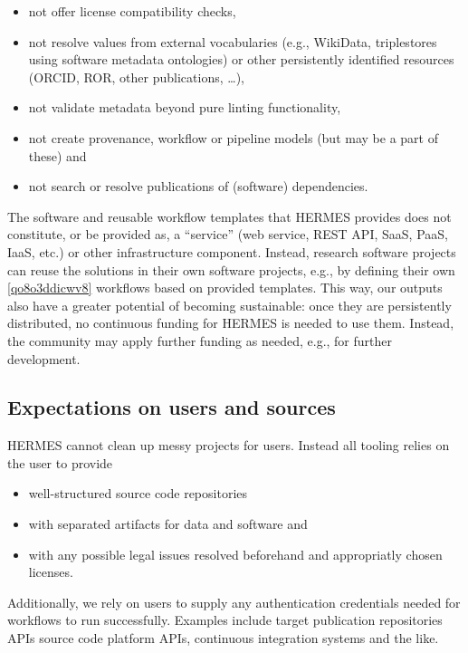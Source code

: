 \documentclass{article}
\begin{document}
\begin{itemize}  
\item not offer license compatibility checks,


\item not resolve values from external vocabularies (e.g., WikiData, triplestores using software metadata ontologies) or other persistently identified resources (ORCID, ROR, other publications, …),


\item not validate metadata beyond pure linting functionality,


\item not create provenance, workflow or pipeline models (but may be a part of these) and


\item not search or resolve publications of (software) dependencies.


\end{itemize}The software and reusable workflow templates that HERMES provides does not constitute, or be provided as, a “service” (web service, REST API, SaaS, PaaS, IaaS, etc.) or other infrastructure component. Instead, research software projects can reuse the solutions in their own software projects, e.g., by defining their own \ref{qo8o3ddicwv8} workflows based on provided templates. This way, our outputs also have a greater potential of becoming sustainable: once they are persistently distributed, no continuous funding for HERMES is needed to use them. Instead, the community may apply further funding as needed, e.g., for further development.



\subsection{Expectations on users and sources}\label{l24mfxuds6zt}
HERMES cannot clean up messy projects for users. Instead all tooling relies on the user to provide

\begin{itemize}  
\item well-structured source code repositories


\item with separated artifacts for data and software and


\item with any possible legal issues resolved beforehand and appropriatly chosen licenses.


\end{itemize}Additionally, we rely on users to supply any authentication credentials needed for workflows to run successfully. Examples include target publication repositories APIs source code platform APIs, continuous integration systems and the like. 
\end{document}
